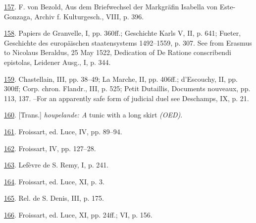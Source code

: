 \protect\hypertarget{23_NOTES.xhtmlux5cux23id_1623}{\protect\hyperlink{10_Chapter_Three__THE_HEROIC_DREAM.xhtmlux5cux23id_1622}{157}}.
F. von Bezold, Aus dem Briefwechsel der Markgräfin Isabella von
Este-Gonzaga, Archiv f. Kulturgesch., VIII, p. 396.

\protect\hypertarget{23_NOTES.xhtmlux5cux23id_1621}{\protect\hyperlink{10_Chapter_Three__THE_HEROIC_DREAM.xhtmlux5cux23id_1620}{158}}.
Papiers de Granvelle, I, pp. 360ff.; Geschichte Karls V, II, p. 641;
Fueter, Geschichte des europäischen staatensystems 1492--1559, p. 307.
See from Erasmus to Nicolaus Beraldus, 25 May 1522, Dedication of De
Ratione conscribendi epistolas, Leidener Ausg., I, p. 344.

\protect\hypertarget{23_NOTES.xhtmlux5cux23id_1619}{\protect\hyperlink{10_Chapter_Three__THE_HEROIC_DREAM.xhtmlux5cux23id_1618}{159}}.
Chastellain, III, pp. 38--49; La Marche, II, pp. 406ff.; d'Escouchy, II,
pp. 300ff; Corp. chron. Flandr., III, p. 525; Petit Dutaillis, Documents
nouveaux, pp. 113, 137. --For an apparently safe form of judicial duel
see Deschamps, IX, p. 21.

\protect\hypertarget{23_NOTES.xhtmlux5cux23id_1617}{\protect\hyperlink{10_Chapter_Three__THE_HEROIC_DREAM.xhtmlux5cux23id_1616}{160}}.
{[}Trans.{]} \emph{houpelande: A} tunic with a long skirt \emph{(OED)}.

\protect\hypertarget{23_NOTES.xhtmlux5cux23id_1615}{\protect\hyperlink{10_Chapter_Three__THE_HEROIC_DREAM.xhtmlux5cux23id_1614}{161}}.
Froissart, ed. Luce, IV, pp. 89--94.

\protect\hypertarget{23_NOTES.xhtmlux5cux23id_1613}{\protect\hyperlink{10_Chapter_Three__THE_HEROIC_DREAM.xhtmlux5cux23id_1612}{162}}.
Froissart, IV, pp. 127--28.

\protect\hypertarget{23_NOTES.xhtmlux5cux23id_1611}{\protect\hyperlink{10_Chapter_Three__THE_HEROIC_DREAM.xhtmlux5cux23id_1610}{163}}.
Lefèvre de S. Remy, I, p. 241.

\protect\hypertarget{23_NOTES.xhtmlux5cux23id_1609}{\protect\hyperlink{10_Chapter_Three__THE_HEROIC_DREAM.xhtmlux5cux23id_1608}{164}}.
Froissart, ed. Luce, XI, p. 3.

\protect\hypertarget{23_NOTES.xhtmlux5cux23id_1607}{\protect\hyperlink{10_Chapter_Three__THE_HEROIC_DREAM.xhtmlux5cux23id_1606}{165}}.
Rel. de S. Denis, III, p. 175.

\protect\hypertarget{23_NOTES.xhtmlux5cux23id_1605}{\protect\hyperlink{10_Chapter_Three__THE_HEROIC_DREAM.xhtmlux5cux23id_1604}{166}}.
Froissart, ed. Luce, XI, pp. 24ff.; VI, p. 156.

